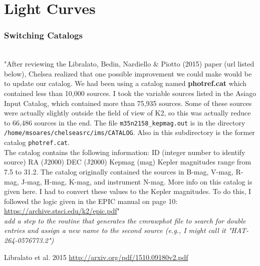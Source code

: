 \chapter*{Light Curves}


\subsection*{Switching Catalogs}\\[5mm]
 "After reviewing the Libralato, Bedin, Nardiello $\&$ Piotto (2015) paper (url listed below), Chelsea realized that one possible improvement we could make would be to update our catalog. We had been using a catalog named \textbf{photref.cat} which contained less than 10,000 sources. I took the variable sources listed in the Asiago Input Catalog, which contained more than 75,935 sources. Some of these sources were actually slightly outside the field of view of K2, so this was actually reduce to 66,486 sources in the end. The file \texttt{m35n2158\_kepmag.out} is in the directory \texttt{/home/msoares/chelseasrc/ims/CATALOG}. Also in this subdirectory is the former catalog \texttt{photref.cat}. \\
The catalog contains the following information:
ID (integer number to identify source)   RA (J2000)   DEC (J2000)   Kepmag (mag)
Kepler magnitudes range from 7.5 to 31.2. 
The  catalog originally contained the sources in B-mag, V-mag, R-mag, J-mag, H-mag, K-mag, and instrument N-mag. More info on this catalog is given here. I had to convert these values to the Kepler magnitudes. To do this, I followed the logic given in the EPIC manual on page 10: \url{https://archive.stsci.edu/k2/epic.pdf}"\\

\textit{add a step to the routine that generates the cmrawphot file to search for double entries and assign a new name to the second source (e.g., I might call it "HAT-264-0576773.2")}

Libralato et al. 2015 \url{http://arxiv.org/pdf/1510.09180v2.pdf}


